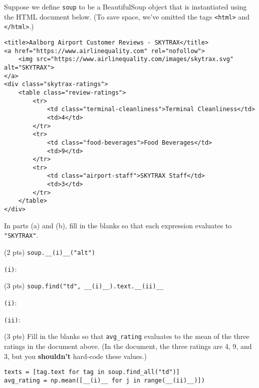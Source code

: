 \documentclass[twoside,12pt]{article}
\begin{document}
\begin{probset}
\begin{prob}[(10 pts)]
\begin{prob}[(8 pts)]
Suppose we define \texttt{soup} to be a BeautifulSoup object that is instantiated using the HTML document below. (To save space, we've omitted the tags \texttt{<html>} and \texttt{</html>}.)
\begin{verbatim}
<title>Aalborg Airport Customer Reviews - SKYTRAX</title>
<a href="https://www.airlinequality.com" rel="nofollow">
    <img src="https://www.airlinequality.com/images/skytrax.svg" alt="SKYTRAX">
</a>
<div class="skytrax-ratings">
    <table class="review-ratings">
        <tr>
            <td class="terminal-cleanliness">Terminal Cleanliness</td>
            <td>4</td>
        </tr>
        <tr>
            <td class="food-beverages">Food Beverages</td>
            <td>9</td>
        </tr>
        <tr>
            <td class="airport-staff">SKYTRAX Staff</td>
            <td>3</td>
        </tr>
    </table>
</div>
\end{verbatim}

In parts (a) and (b), fill in the blanks so that each expression evaluates to \texttt{"SKYTRAX"}.

\begin{subprobset}

\begin{subprob}(2 pts) \hspace{0.1in} \verb|soup.__(i)__("alt")|

\texttt{(i)}: \hspace{0.01in} \inlineresponsebox[4in]{}
    
\end{subprob}

\begin{subprob}(3 pts) \hspace{0.1in} \verb|soup.find("td", __(i)__).text.__(ii)__|

\texttt{(i)}: \hspace{0.01in} \inlineresponsebox[4in]{}

\texttt{(ii)}: \inlineresponsebox[4in]{}
    
\end{subprob}

\newpage

\begin{subprob}(3 pts) Fill in the blanks so that \texttt{avg\_rating} evaluates to the mean of the three ratings in the document above. (In the document, the three ratings are 4, 9, and 3, but you \textbf{shouldn't} hard-code these values.)

\begin{verbatim}
texts = [tag.text for tag in soup.find_all("td")]
avg_rating = np.mean([__(i)__ for j in range(__(ii)__)])
\end{verbatim}


\end{subprob}
\end{subprobset}
\end{prob}
\end{prob}
\end{probset}
\end{document}
